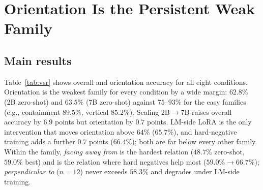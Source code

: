 \section{Orientation Is the Persistent Weak Family}
\label{sec:vsr}

\subsection{Main results}
Table~\ref{tab:vsr} shows overall and orientation accuracy for all eight
conditions. Orientation is the weakest family for every condition by a wide
margin: $62.8\%$ (2B zero-shot) and $63.5\%$ (7B zero-shot) against
$75$--$93\%$ for the easy families (e.g., containment $89.5\%$, vertical
$85.2\%$). Scaling 2B$\rightarrow$7B raises overall accuracy by $6.9$ points but
orientation by $0.7$ points. LM-side LoRA is the only intervention that moves
orientation above $64\%$ ($65.7\%$), and hard-negative training adds a further
$0.7$ points ($66.4\%$); both are far below every other family. Within the
family, \emph{facing away from} is the hardest relation ($48.7\%$ zero-shot,
$59.0\%$ best) and is the relation where hard negatives help most
($59.0\%\rightarrow66.7\%$); \emph{perpendicular to} ($n{=}12$) never exceeds
$58.3\%$ and degrades under LM-side training.

